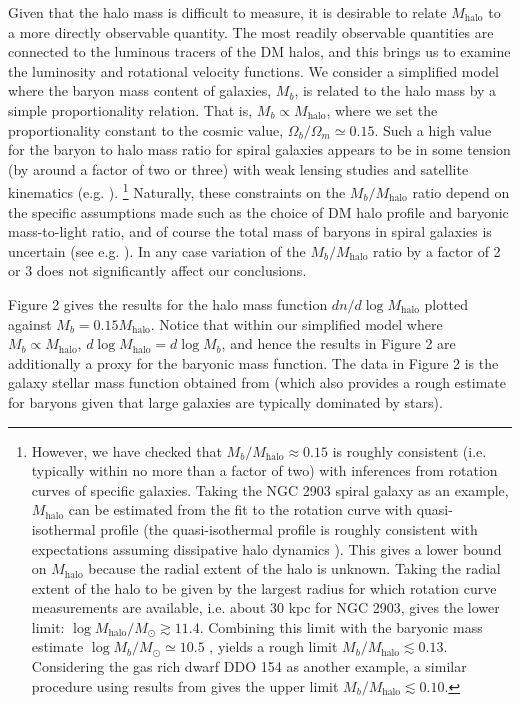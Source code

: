 \documentclass[12pt]{article}
\begin{document}
Given that the halo mass is difficult to measure, it is desirable to relate $M_{\text{halo}}$ to a more directly observable quantity. 
The most readily observable quantities  are connected to the luminous tracers of the DM halos, and this brings us to examine the 
luminosity and rotational velocity functions. We consider a simplified model where the baryon mass content of galaxies, $M_{b}$, 
is related to the halo mass by a simple proportionality relation. That is, $M_{b} \propto M_{\text{halo}}$, where we set the 
proportionality constant to the cosmic value, $\Omega_b/\Omega_m \simeq 0.15$. Such a high value for the baryon to halo mass ratio for 
spiral galaxies appears to be  in some tension (by around a factor of two or three) with weak lensing studies and satellite 
kinematics (e.g. \cite{dutton,mand}). 
\footnote{However, we have checked that $M_b/M_{\text{halo}} \approx 0.15$ is 
roughly consistent (i.e. typically within no more than a factor of two) with inferences from rotation curves of specific galaxies. 
Taking the NGC 2903 spiral galaxy as an example, $M_{\text{halo}}$ can be estimated from the fit to the rotation curve 
with quasi-isothermal profile \cite{things} (the quasi-isothermal profile is roughly consistent with  expectations assuming dissipative 
halo dynamics \cite{m1,rich8,footexploredd}). This gives a lower bound on $M_{\text{halo}}$ because the radial extent of the 
halo is unknown. Taking the radial extent of the halo to be given by the largest radius for which rotation curve measurements are 
available, i.e. about 30 kpc for NGC 2903, gives the lower limit: $\log M_{\text{halo}}/M_\odot \gtrsim 11.4$. Combining 
this limit with the baryonic mass estimate $\log M_b/M_\odot \simeq 10.5$ \cite{things}, yields a rough limit $M_b/M_{\text{halo}} \lesssim 0.13$. 
Considering the gas rich dwarf DDO 154 as another example, a similar procedure using results from \cite{littlethings} gives the 
upper limit $M_b/M_{\text{halo}} \lesssim 0.10$.}
Naturally, these constraints
on the $M_b/M_{\text{halo}}$ ratio depend on the specific assumptions 
made such as the choice of 
DM halo profile and baryonic mass-to-light ratio, and of course
the total mass of baryons in spiral galaxies is uncertain (see e.g. \cite{italian}). 
In any case variation of the $M_b/M_{\text{halo}}$ ratio by a factor of 2 or 3
does not significantly affect our conclusions.

Figure 2 gives the results for the halo mass function $dn/d\log M_{\text{halo}}$ plotted against $M_b = 0.15M_{\text{halo}}$. 
Notice that within our simplified model where $M_b \propto M_{\text{halo}}$, $d \log M_{\text{halo}} = d\log M_b$, and hence the results 
in Figure 2 are additionally a proxy for the baryonic mass function.
The data  in Figure 2 is the galaxy stellar mass function obtained from \cite{bell} (which also provides a rough estimate for baryons 
given that large galaxies are typically dominated by stars). 
\end{document}
